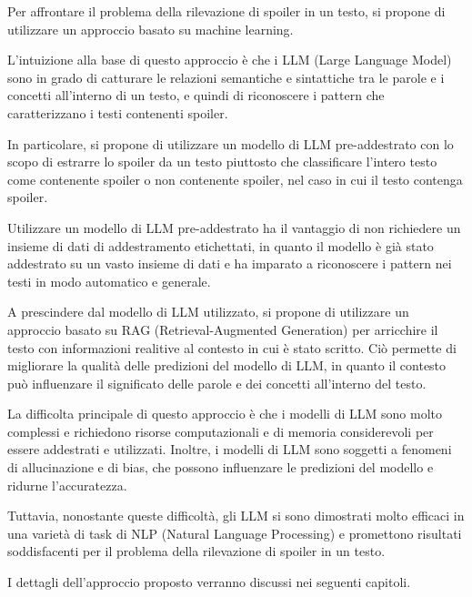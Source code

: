 Per affrontare il problema della rilevazione di spoiler in
un testo, si propone di utilizzare un approccio basato su
machine learning.

L'intuizione alla base di questo approccio è che i LLM
(Large Language Model) sono in grado di catturare le
relazioni semantiche e sintattiche tra le parole e i
concetti all'interno di un testo, e quindi di riconoscere i
pattern che caratterizzano i testi contenenti spoiler.

In particolare, si propone di utilizzare un modello di LLM
pre-addestrato con lo scopo di estrarre lo spoiler da un
testo piuttosto che classificare l'intero testo come
contenente spoiler o non contenente spoiler, nel caso in
cui il testo contenga spoiler.

Utilizzare un modello di LLM pre-addestrato ha il vantaggio
di non richiedere un insieme di dati di addestramento
etichettati, in quanto il modello è già stato addestrato su
un vasto insieme di dati e ha imparato a riconoscere i
pattern nei testi in modo automatico e generale.

A prescindere dal modello di LLM utilizzato, si propone di
utilizzare un approccio basato su RAG (Retrieval-Augmented
Generation) per arricchire il testo con informazioni
realitive al contesto in cui è stato scritto.
Ciò permette di migliorare la qualità delle predizioni del
modello di LLM, in quanto il contesto può influenzare il
significato delle parole e dei concetti all'interno del
testo.

La difficolta principale di questo approccio è che i
modelli di LLM sono molto complessi e richiedono risorse
computazionali e di memoria considerevoli per essere
addestrati e utilizzati.
Inoltre, i modelli di LLM sono soggetti a fenomeni di
allucinazione e di bias, che possono influenzare le
predizioni del modello e ridurne l'accuratezza.

Tuttavia, nonostante queste difficoltà, gli LLM si sono
dimostrati molto efficaci in una varietà di task di NLP
(Natural Language Processing) e promettono risultati
soddisfacenti per il problema della rilevazione di spoiler
in un testo.

I dettagli dell'approccio proposto verranno discussi nei
seguenti capitoli.

